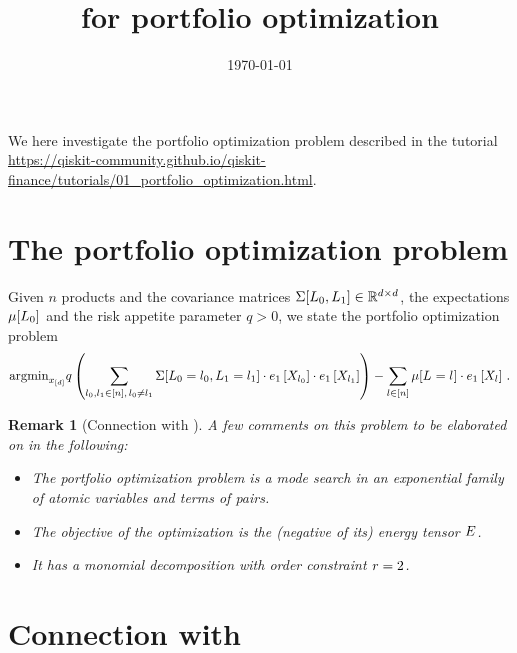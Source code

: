 \documentclass[aps,onecolumn,nofootinbib,pra]{article}
\newtheorem{remark}{Remark}
\begin{document}
\title{\tnreason for portfolio optimization}

\maketitle
\date{\today}

We here investigate the portfolio optimization problem described in the tutorial \url{https://qiskit-community.github.io/qiskit-finance/tutorials/01_portfolio_optimization.html}.

\section{The portfolio optimization problem}

\newcommand{\productsnum}{n}


Given $\productsnum$ products and the covariance matrices $\Sigma[L_{0},L_{1}]\in\mathbb{R}^{d\times d}$, the expectations $\mu[L_{0}]$ and the risk appetite parameter $q>0$, we state the portfolio optimization problem
\begin{align}
	\argmin_{\shortcatindices} 
	q \left(\sum_{\selindexof{0},\selindexof{1}\in[\productsnum] , \, \selindexof{0}\neq\selindexof{1}} 
	\Sigma[\indexedselvariableof{0},\indexedselvariableof{1}] \cdot \onehotmapofat{1}{\catvariableof{\selindexof{0}}}\cdot \onehotmapofat{1}{\catvariableof{\selindexof{1}}}\right) 
	- \sum_{\selindex\in[\productsnum]} \mu[\indexedselvariable] \cdot \onehotmapofat{1}{\catvariableof{\selindex}} \, . 
\end{align}

\begin{remark}[Connection with \tnreason]
A few comments on this problem to be elaborated on in the following:
\begin{itemize}
	\item	The portfolio optimization problem is a mode search in an exponential family of atomic variables and terms of pairs.
	\item The objective of the optimization is the (negative of its) energy tensor $E$.
	 \item It has a monomial decomposition with order constraint $r=2$.
\end{itemize}
\end{remark}

\section{Connection with \tnreason}
\end{document}
